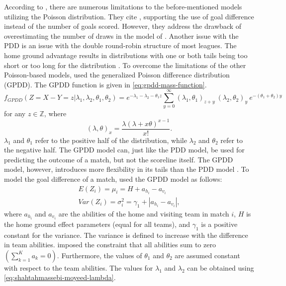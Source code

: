 According to \citet{bib:shahtahmassebi-moyeed-2016}, there are numerous limitations to the before-mentioned models utilizing the Poisson distribution. They cite \citet{bib:karlis-ntzoufras-2008}, supporting the use of goal difference instead of the number of goals scored. However, they address the drawback of overestimating the number of draws in the model of \citet{bib:karlis-ntzoufras-2008}. Another issue with the PDD is an issue with the double round-robin structure of most leagues. The home ground advantage results in distributions with one or both tails being too short or too long for the distribution \citep{bib:shahtahmassebi-moyeed-2016}. To overcome the limitations of the other Poisson-based models, \citet{bib:shahtahmassebi-moyeed-2016} used the generalized Poisson difference distribution (GPDD). The GPDD function is given in \cref{eq:gpdd-mass-function}.
\begin{equation}
    f_{GPDD}(Z = X - Y = z | \lambda_{1}, \lambda_{2}, \theta_{1}, \theta_{2}) = e^{-\lambda_{1} - \lambda_{2} - \theta_{1} z} \sum_{y=0}^{\infty} (\lambda_{1}, \theta_{1})_{z + y}\ (\lambda_{2}, \theta_{2})_{y}\ e^{-(\theta_{1} + \theta_{2})y}
    \label{eq:gpdd-mass-function}
\end{equation}
for any $z \in \mathbb{Z}$, where
\begin{equation*}
    (\lambda, \theta)_{x} = \frac{\lambda(\lambda + x \theta)^{x - 1}}{x!}.
\end{equation*}
$\lambda_{1}$ and $\theta_{1}$ refer to the positive half of the distribution, while $\lambda_{2}$ and $\theta_{2}$ refer to the negative half. The GPDD model can, just like the PDD model, be used for predicting the outcome of a match, but not the scoreline itself. The GPDD model, however, introduces more flexibility in its tails than the PDD model \citep{bib:shahtahmassebi-moyeed-2016}. To model the goal difference of a match, \citet{bib:shahtahmassebi-moyeed-2016} used the GPDD model as follows:
\begin{equation*}
    \begin{aligned}
        E(Z_{i}) = \mu_{i} = H + a_{h_{i}} - a_{v_{i}} \\
        Var(Z_{i}) = \sigma_{i}^{2} = \gamma_{1} + | a_{h_{i}} - a_{v_{i}} |,
    \end{aligned}
\end{equation*}
where $a_{h_{i}}$ and $a_{v_{i}}$ are the abilities of the home and visiting team in match $i$, $H$ is the home ground effect parameters (equal for all teams), and $\gamma_{1}$ is a positive constant for the variance. The variance is defined to increase with the difference in team abilities. \citet{bib:shahtahmassebi-moyeed-2016} imposed the constraint that all abilities sum to zero $(\sum_{k=1}^{K} a_{k} = 0)$. Furthermore, the values of $\theta_{1}$ and $\theta_{2}$ are assumed constant with respect to the team abilities. The values for $\lambda_{1}$ and $\lambda_{2}$ can be obtained using \cref{eq:shahtahmassebi-moyeed-lambda}.
